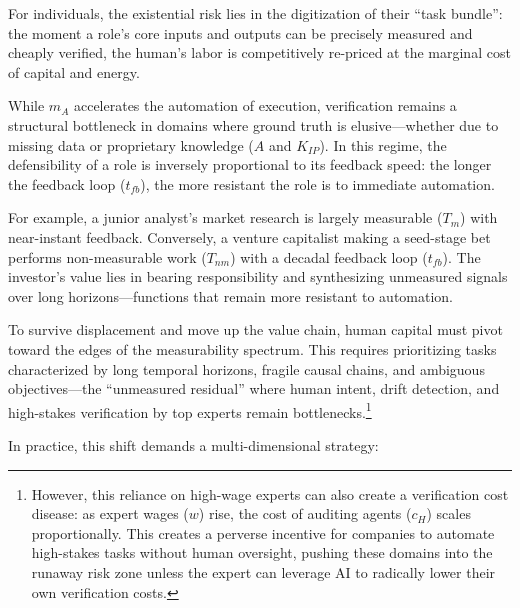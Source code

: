 \documentclass[12pt, letter]{article}
\begin{document}
For individuals, the existential risk lies in the digitization of their ``task bundle'': the moment a role’s core inputs and outputs can be precisely measured and cheaply verified, the human's labor is competitively re-priced at the marginal cost of capital and energy.

While $m_A$ accelerates the automation of execution, verification remains a structural bottleneck in domains where ground truth is elusive—whether due to missing data or proprietary knowledge ($A$ and $K_{IP}$). In this regime, the defensibility of a role is inversely proportional to its feedback speed: the longer the feedback loop ($t_{fb}$), the more resistant the role is to immediate automation.

For example, a junior analyst’s market research is largely measurable ($T_m$) with near-instant feedback. Conversely, a venture capitalist making a seed-stage bet performs non-measurable work ($T_{nm}$) with a decadal feedback loop ($t_{fb}$). The investor's value lies in bearing responsibility and synthesizing unmeasured signals over long horizons—functions that remain more resistant to automation.

To survive displacement and move up the value chain, human capital must pivot toward the edges of the measurability spectrum. This requires prioritizing tasks characterized by long temporal horizons, fragile causal chains, and ambiguous objectives—the ``unmeasured residual'' where human intent, drift detection, and high-stakes verification by top experts remain bottlenecks.\footnote{However, this reliance on high-wage experts can also create a verification cost disease: as expert wages ($w$) rise, the cost of auditing agents ($c_H$) scales proportionally. This creates a perverse incentive for companies to automate high-stakes tasks without human oversight, pushing these domains into the runaway risk zone unless the expert can leverage AI to radically lower their own verification costs.}

In practice, this shift demands a multi-dimensional strategy:
\end{document}
